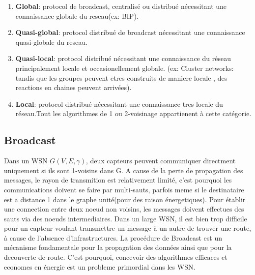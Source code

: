 \begin{enumerate}
 \item \textbf{Global}:         protocol de broadcast, centralisé ou distribué nécessitant une connaissance globale du reseau(ex: BIP).
 \item \textbf{Quasi-global}:   protocol distribué de broadcast nécessitant une connaissance quasi-globale du reseau.
 \item \textbf{Quasi-local}:    protocol distribué nécessitant une connaissance du réseau principalement locale et occasionellement globale.
(ex: Cluster networks: tandis que les groupes peuvent etres construits de maniere locale , des reactions en chaines peuvent arrivées).
 \item \textbf{Local}: 		protocol distribué nécessitant une connaissance tres locale du réseau.Tout les algorithmes de 1 ou 2-voisinage appartienent à cette catégorie.
\end{enumerate}


\subsection{Broadcast}

Dans un WSN $G(V,E,\gamma)$, deux capteurs peuvent communiquer directment uniquement si ils sont 1-voisins dans G.
A cause de la perte de propagation des messages, le rayon de transmition est relativement limité, c'est pourquoi les communications doivent se faire par multi-sauts, parfois meme si le destinataire est a distance 1 dans le graphe 
unité(pour des raison énergetiques). Pour établir une connection entre deux noeud non voisins, les messages doivent effectues des sauts via des noeuds intermediaires. Dans un large WSN, il est bien trop difficile pour un capteur voulant
transmettre un message à un autre de trouver une route, à cause de l'absence d'infrastructures. 
La procédure de Broadcast est un mécanisme fondamentale pour la propagation des données ainsi que pour la decouverte de route. C'est pourquoi, concevoir des algorithmes efficaces et economes en énergie est un probleme primordial 
dans les WSN. 





